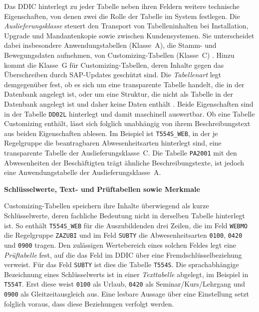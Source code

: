 Das DDIC hinterlegt zu jeder Tabelle neben ihren Feldern weitere technische Eigenschaften, von denen zwei die Rolle der Tabelle im System festlegen. Die \emph{Auslieferungsklasse} steuert den Transport von Tabelleninhalten bei Installation, Upgrade und Mandantenkopie sowie zwischen Kundensystemen. Sie unterscheidet dabei insbesondere Anwendungstabellen (Klasse~A), die Stamm- und Bewegungsdaten aufnehmen, von Customizing-Tabellen (Klasse~C) \cite{sap_ddic_nodate}. Hinzu kommt die Klasse~G für Customizing-Tabellen, deren Inhalte gegen das Überschreiben durch SAP-Updates geschützt sind. %
Die \emph{Tabellenart} legt demgegenüber fest, ob es sich um eine transparente Tabelle handelt, die in der Datenbank angelegt ist, oder um eine Struktur, die nicht als Tabelle in der Datenbank angelegt ist und daher keine Daten enthält \cite{sap_ddic_nodate}. Beide Eigenschaften sind in der Tabelle \texttt{DD02L} hinterlegt und damit maschinell auswertbar. Ob eine Tabelle Customizing enthält, lässt sich folglich unabhängig von ihrem Beschreibungstext aus beiden Eigenschaften ablesen. Im Beispiel ist \texttt{T554S\_WEB}, in der je Regelgruppe die beantragbaren Abwesenheitsarten hinterlegt sind, eine transparente Tabelle der Auslieferungsklasse~C. %
Die Tabelle \texttt{PA2001} mit den Abwesenheiten der Beschäftigten trägt ähnliche Beschreibungstexte, ist jedoch eine Anwendungstabelle der Auslieferungsklasse~A.

\textbf{Schlüsselwerte, Text- und Prüftabellen sowie Merkmale}

Customizing-Tabellen speichern ihre Inhalte überwiegend als kurze Schlüsselwerte, deren fachliche Bedeutung nicht in derselben Tabelle hinterlegt ist. So enthält \texttt{T554S\_WEB} für die Auszubildenden drei Zeilen, die im Feld \texttt{WEBMO} die Regelgruppe \texttt{ZAZUBI} und im Feld \texttt{SUBTY} die Abwesenheitsarten \texttt{0100}, \texttt{0420} und \texttt{0900} tragen. Den zulässigen Wertebereich eines solchen Feldes legt eine \emph{Prüftabelle} fest, auf die das Feld im DDIC über eine Fremdschlüsselbeziehung verweist. Für das Feld \texttt{SUBTY} ist dies die Tabelle \texttt{T554S}. Die sprachabhängige Bezeichnung eines Schlüsselwerts ist in einer \emph{Texttabelle} abgelegt, im Beispiel in \texttt{T554T}. Erst diese weist \texttt{0100} als Urlaub, \texttt{0420} als Seminar/Kurs/Lehrgang und \texttt{0900} als Gleitzeitausgleich aus. Eine lesbare Aussage über eine Einstellung setzt folglich voraus, dass diese Beziehungen verfolgt werden.

